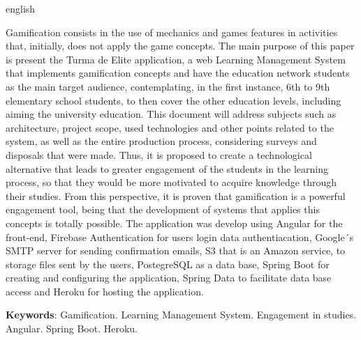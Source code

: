 \begin{resumo}[Abstract]
 \begin{otherlanguage*}{english}
 
    \vspace{\onelineskip}
 
     Gamification consists in the use of mechanics and games features in activities that, initially, does not apply the game concepts. The main purpose of this paper is present the Turma de Elite application, a web Learning Management System that implements gamification concepts and have the education network students as the main target audience, contemplating, in the first instance, 6th to 9th elementary school students, to then cover the other education levels, including aiming the university education.
     This document will address subjects such as architecture, project scope, used technologies and other points related to the system, as well as the entire production process, considering surveys and disposals that were made.
     Thus, it is proposed to create a technological alternative that leads to greater engagement of the students in the learning process, so that they would be more motivated to acquire knowledge through their studies. From this perspective, it is proven that gamification is a powerful engagement tool, being that the development of systems that applies this concepts is totally possible. The application was develop using Angular for the front-end, Firebase Authentication for users login data authentiacation, Google´s SMTP server for sending confirmation emails, S3 that is an Amazon service, to storage files sent by the users, PostegreSQL as a data base, Spring Boot for creating and configuring the application, Spring Data to facilitate data base access and Heroku for hosting the application. 
     
   \vspace{\onelineskip}
   \noindent 
   \textbf{Keywords}: Gamification. Learning Management System. Engagement in studies. Angular. Spring Boot. Heroku.
 \end{otherlanguage*}
\end{resumo}